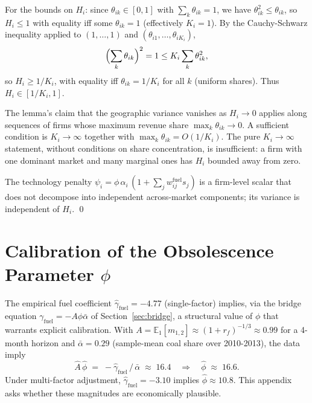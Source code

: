 \documentclass[12pt,a4paper]{article}
\newcommand{\E}{\mathbb{E}}
\begin{document}
For the bounds on $H_i$: since $\theta_{ik}\in[0,1]$ with $\sum_k\theta_{ik}=1$, we have $\theta_{ik}^2\leq\theta_{ik}$, so $H_i\leq 1$ with equality iff some $\theta_{ik}=1$ (effectively $K_i=1$). By the Cauchy-Schwarz inequality applied to $(1,\dots,1)$ and $(\theta_{i1},\dots,\theta_{iK_i})$,
\[
\Bigl(\sum_k \theta_{ik}\Bigr)^2 = 1 \leq K_i\sum_k \theta_{ik}^2,
\]
so $H_i\geq 1/K_i$, with equality iff $\theta_{ik}=1/K_i$ for all $k$ (uniform shares). Thus $H_i \in [1/K_i, 1]$.

The lemma's claim that the geographic variance vanishes as $H_i\to 0$ applies along sequences of firms whose maximum revenue share $\max_k\theta_{ik}\to 0$. A sufficient condition is $K_i\to\infty$ together with $\max_k\theta_{ik}=O(1/K_i)$. The pure $K_i\to\infty$ statement, without conditions on share concentration, is insufficient: a firm with one dominant market and many marginal ones has $H_i$ bounded away from zero.

The technology penalty $\psi_i = \phi\, \alpha_i\, (1 + \sum_j w^{\mathrm{fuel}}_{ij} s_j)$ is a firm-level scalar that does not decompose into independent across-market components; its variance is independent of $H_i$. \qed


\section{Calibration of the Obsolescence Parameter $\phi$}\label{app:phi_calibration}

The empirical fuel coefficient $\hat\gamma_{\mathrm{fuel}} = -4.77$ (single-factor) implies, via the bridge equation $\gamma_{\mathrm{fuel}} = -A\phi\bar\alpha$ of Section~\ref{sec:bridge}, a structural value of $\phi$ that warrants explicit calibration. With $A = \E_1[m_{1,2}] \approx (1+r_f)^{-1/3} \approx 0.99$ for a 4-month horizon and $\bar\alpha = 0.29$ (sample-mean coal share over 2010-2013), the data imply
\[
\hat A\,\hat\phi \;=\; -\hat\gamma_{\mathrm{fuel}}\,/\,\bar\alpha \;\approx\; 16.4 \quad \Longrightarrow\quad \hat\phi \;\approx\; 16.6.
\]
Under multi-factor adjustment, $\hat\gamma_{\mathrm{fuel}} = -3.10$ implies $\hat\phi \approx 10.8$. This appendix asks whether these magnitudes are economically plausible.
\end{document}
